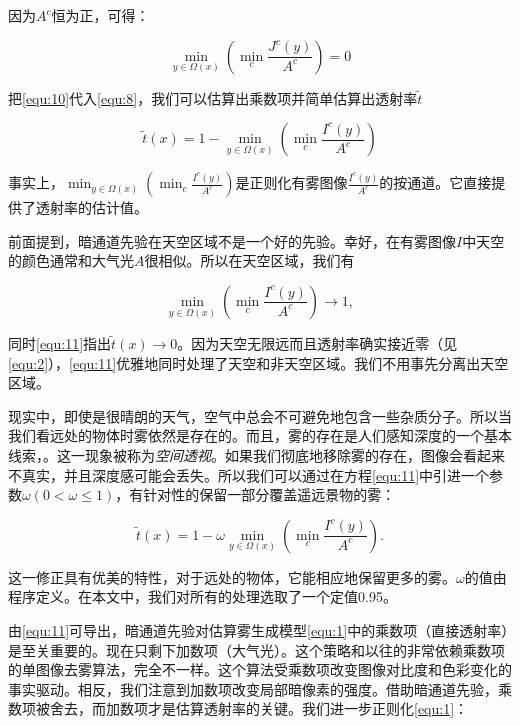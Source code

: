\documentclass{ctexart}
\begin{document}
因为$A^c$恒为正，可得：

\begin{equation}\label{equ:10}
	\min_{y \in \Omega(x)} (\min_c \frac{J^c(y)}{A^c}) = 0
\end{equation}

把\ref{equ:10}代入\ref{equ:8}，我们可以估算出乘数项并简单估算出透射率$\tilde{t}$

\begin{equation}\label{equ:11}
	\tilde{t}(x) = 1 - \min_{y \in \Omega(x)} (\min_c \frac{I^c(y)}{A^c})
\end{equation}

事实上，$\min_{y \in \Omega(x)} (\min_c \frac{I^c(y)}{A^c})$是正则化有雾图像$\frac{I^c(y)}{A^c}$的按通道。它直接提供了透射率的估计值。\par

前面提到，暗通道先验在天空区域不是一个好的先验。幸好，在有雾图像$I$中天空的颜色通常和大气光$A$很相似。所以在天空区域，我们有

\[\min_{y \in \Omega(x)} (\min_c \frac{I^c(y)}{A^c}) \to 1,\]

同时\ref{equ:11}指出$\tilde{t}(x) \to 0$。因为天空无限远而且透射率确实接近零（见\ref{equ:2}），\ref{equ:11}优雅地同时处理了天空和非天空区域。我们不用事先分离出天空区域。\par

现实中，即使是很晴朗的天气，空气中总会不可避免地包含一些杂质分子。所以当我们看远处的物体时雾依然是存在的。而且，雾的存在是人们感知深度的一个基本线索\cite{Goldstein1980}，\cite{PreethamShirleySmits1999}。这一现象被称为\emph{空间透视}。如果我们彻底地移除雾的存在，图像会看起来不真实，并且深度感可能会丢失。所以我们可以通过在方程\ref{equ:11}中引进一个参数$\omega (0 < \omega \le 1)$，有针对性的保留一部分覆盖遥远景物的雾：

\begin{equation}\label{equ:12}
	\tilde{t}(x) = 1 - \omega\min_{y \in \Omega(x)} (\min_c \frac{I^c(y)}{A^c}).
\end{equation}

这一修正具有优美的特性，对于远处的物体，它能相应地保留更多的雾。$\omega$的值由程序定义。在本文中，我们对所有的处理选取了一个定值0.95。\par

由\ref{equ:11}可导出，暗通道先验对估算雾生成模型\ref{equ:1}中的乘数项（直接透射率）是至关重要的。现在只剩下加数项（大气光）。这个策略和以往的非常依赖乘数项的单图像去雾算法\cite{Fattal2008}，\cite{Tan2008}完全不一样。这个算法受乘数项改变图像对比度\cite{Tan2008}和色彩变化\cite{Fattal2008}的事实驱动。相反，我们注意到加数项改变局部暗像素的强度。借助暗通道先验，乘数项被舍去，而加数项才是估算透射率的关键。我们进一步正则化\ref{equ:1}：
\end{document}
